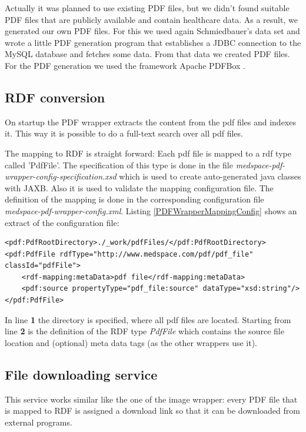 Actually it was planned to use existing PDF files, but we didn't found suitable PDF files that are publicly available and contain healthcare data. As a result, we generated our own PDF files. For this we used again Schmiedbauer's data set and wrote a little PDF generation program that establishes a JDBC connection to the MySQL database and fetches some data. From that data we created PDF files. For the PDF generation we used the framework Apache PDFBox \cite{PDFBox}.  

\subsection{RDF conversion}

On startup the PDF wrapper extracts the content from the pdf files and indexes it. This way it is possible to do a full-text search over all pdf files. 

The mapping to RDF is straight forward: Each pdf file is mapped to a rdf type called 'PdfFile'. The specification of this type is done in the file \emph{medspace-pdf-wrapper-config-specification.xsd} which is used to create auto-generated java classes with JAXB. Also it is used to validate the mapping configuration file. The definition of the mapping is done in the corresponding configuration file \emph{medspace-pdf-wrapper-config.xml}. Listing \ref{PDFWrapperMappingConfig} shows an extract of the configuration file:

\begin{lstlisting}[style=RdfCodeStyle, caption=Extract of the pdf wrapper configuration, label=PDFWrapperMappingConfig]
<pdf:PdfRootDirectory>./_work/pdfFiles/</pdf:PdfRootDirectory>
<pdf:PdfFile rdfType="http://www.medspace.com/pdf/pdf_file" classId="pdfFile">
	<rdf-mapping:metaData>pdf file</rdf-mapping:metaData>
    <pdf:source propertyType="pdf_file:source" dataType="xsd:string"/>
</pdf:PdfFile>
\end{lstlisting}

In line \textbf{1} the directory is specified, where all pdf files are located.
Starting from line \textbf{2} is the definition of the RDF type \emph{PdfFile} which contains the source file location and (optional) meta data tags (as the other wrappers use it).

\subsection{File downloading service}

This service works similar like the one of the image wrapper: every PDF file that is mapped to RDF is assigned a download link so that it can be downloaded from external programs.

